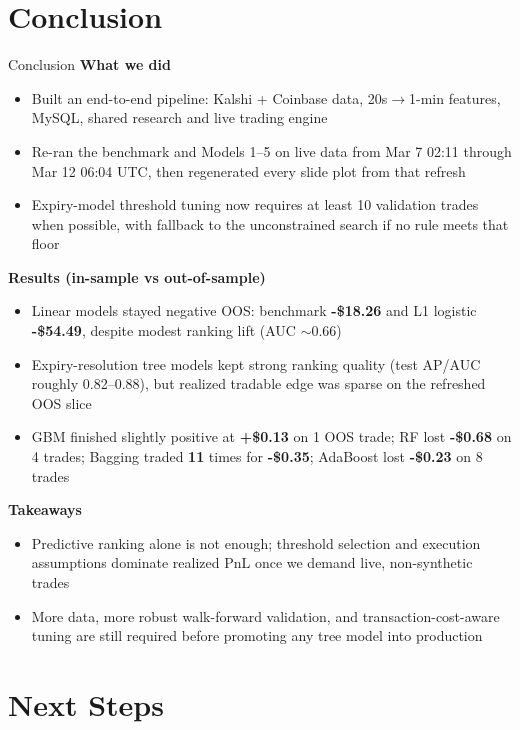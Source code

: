 \documentclass[english, xcolor=dvipsnames, aspectratio=169]{beamer}
\newcommand{\itemj}{\item \justifying}
\newcommand{\sectiontitle}{}
\begin{document}
\renewcommand{\sectiontitle}{Conclusion}
\section{\sectiontitle}

\begin{frame}{\sectiontitle}
\footnotesize
\textbf{What we did}
\begin{itemize}
    \itemj Built an end-to-end pipeline: Kalshi + Coinbase data, 20s$\to$1-min features, MySQL, shared research and live trading engine
    \itemj Re-ran the benchmark and Models 1--5 on live data from Mar 7 02:11 through Mar 12 06:04 UTC, then regenerated every slide plot from that refresh
    \itemj Expiry-model threshold tuning now requires at least 10 validation trades when possible, with fallback to the unconstrained search if no rule meets that floor
\end{itemize}

\vspace{0.1cm}
\textbf{Results (in-sample vs out-of-sample)}
\begin{itemize}
    \itemj Linear models stayed negative OOS: benchmark \textbf{-\$18.26} and L1 logistic \textbf{-\$54.49}, despite modest ranking lift (AUC $\sim$0.66)
    \itemj Expiry-resolution tree models kept strong ranking quality (test AP/AUC roughly 0.82--0.88), but realized tradable edge was sparse on the refreshed OOS slice
    \itemj GBM finished slightly positive at \textbf{+\$0.13} on 1 OOS trade; RF lost \textbf{-\$0.68} on 4 trades; Bagging traded \textbf{11} times for \textbf{-\$0.35}; AdaBoost lost \textbf{-\$0.23} on 8 trades
\end{itemize}

\vspace{0.1cm}
\textbf{Takeaways}
\begin{itemize}
    \itemj Predictive ranking alone is not enough; threshold selection and execution assumptions dominate realized PnL once we demand live, non-synthetic trades
    \itemj More data, more robust walk-forward validation, and transaction-cost-aware tuning are still required before promoting any tree model into production
\end{itemize}
\end{frame}

\renewcommand{\sectiontitle}{Next Steps}
\section{\sectiontitle}
\end{document}
